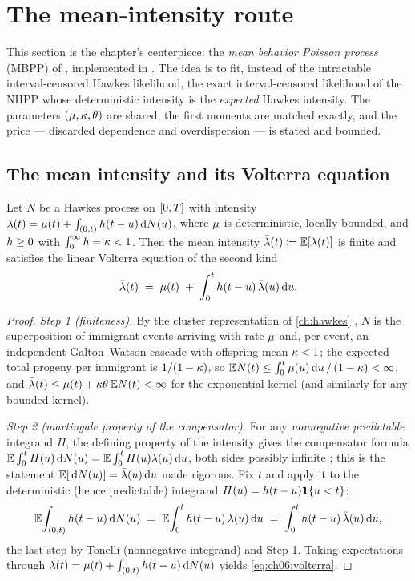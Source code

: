 \section{The mean-intensity route}\label{ch06:sec:mbpp}

This section is the chapter's centerpiece: the \emph{mean behavior Poisson
process} (MBPP) of \citet{rizoiu2022}, implemented in
. The idea is to fit, instead of the intractable
interval-censored Hawkes likelihood, the exact interval-censored likelihood
of the NHPP whose deterministic intensity is the \emph{expected} Hawkes
intensity. The parameters $(\mu,\kappa,\theta)$ are shared, the first
moments are matched exactly, and the price --- discarded dependence and
overdispersion --- is stated and bounded.

\subsection{The mean intensity and its Volterra equation}\label{ch06:sec:volterra}

\begin{theorem}\label{thm:ch06:volterra}
Let $N$ be a Hawkes process on $[0,T]$ with intensity
$\lambda(t) = \mu(t) + \int_{(0,t)}h(t-u)\,\mathrm{d} N(u)$, where $\mu$ is
deterministic, locally bounded, and $h \ge 0$ with
$\int_0^\infty h = \kappa < 1$. Then the mean intensity
$\bar{\lambda}(t) \coloneqq \mathbb{E}[\lambda(t)]$ is finite and satisfies the linear Volterra
equation of the second kind
\begin{equation}\label{eq:ch06:volterra}
\bar{\lambda}(t) \;=\; \mu(t) \;+\; \int_0^{t} h(t-u)\,\bar{\lambda}(u)\,\mathrm{d} u .
\end{equation}
\end{theorem}

\begin{proof}
\emph{Step 1 (finiteness).} By the cluster representation of
\cref{ch:hawkes} \citep{hawkesoakes1974}, $N$ is the superposition of
immigrant events arriving with rate $\mu$ and, per event, an independent
Galton--Watson cascade with offspring mean $\kappa < 1$; the expected
total progeny per immigrant is $1/(1-\kappa)$, so
$\mathbb{E} N(t) \le \int_0^t \mu(u)\,\mathrm{d} u \,/\, (1-\kappa) < \infty$, and
$\bar{\lambda}(t) \le \mu(t) + \kappa\theta \,\mathbb{E} N(t) < \infty$ for the
exponential kernel (and similarly for any bounded kernel).

\emph{Step 2 (martingale property of the compensator).} For any
\emph{nonnegative predictable} integrand $H$, the defining property of the
intensity gives the compensator formula
$\mathbb{E}\int_0^t H(u)\,\mathrm{d} N(u) = \mathbb{E} \int_0^t H(u)\lambda(u)\,\mathrm{d} u$, both sides
possibly infinite \citep[II.4]{abgk1993}; this is the statement
$\mathbb{E}[\,\mathrm{d} N(u)] = \bar{\lambda}(u)\,\mathrm{d} u$ made rigorous. Fix $t$ and apply it to the
deterministic (hence predictable) integrand $H(u) = h(t-u)\mathbf{1}\{u<t\}$:
\[
\mathbb{E}\!\int_{(0,t)} h(t-u)\,\mathrm{d} N(u)
 \;=\; \mathbb{E}\!\int_0^{t} h(t-u)\,\lambda(u)\,\mathrm{d} u
 \;=\; \int_0^{t} h(t-u)\,\bar{\lambda}(u)\,\mathrm{d} u ,
\]
the last step by Tonelli (nonnegative integrand) and Step 1. Taking
expectations through
$\lambda(t) = \mu(t) + \int_{(0,t)}h(t-u)\,\mathrm{d} N(u)$ yields
\cref{eq:ch06:volterra}.
\end{proof}

